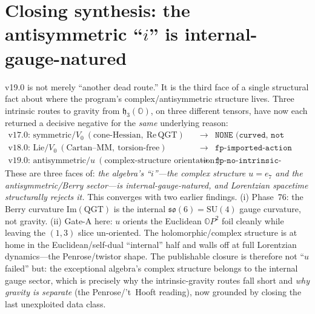 \documentclass[11pt]{article}
\newcommand{\OO}{\mathbb{O}}
\newcommand{\so}{\mathfrak{so}}
\newcommand{\hh}{\mathfrak{h}}
\theoremstyle{plain}\newtheorem{theorem}{Theorem}
\theoremstyle{plain}\newtheorem{proposition}{Proposition}
\theoremstyle{plain}\newtheorem{corollary}{Corollary}
\theoremstyle{definition}\newtheorem{remark}{Remark}
\begin{document}
\section{Closing synthesis: the antisymmetric ``$i$'' is internal-gauge-natured}
v19.0 is not merely ``another dead route.'' It is the third face of a single structural fact
about where the program's complex/antisymmetric structure lives. Three intrinsic routes to
gravity from $\hh_3(\OO)$, on three different tensors, have now each returned a decisive
negative for the \emph{same} underlying reason:
\[
\begin{array}{lll}
\text{v17.0: symmetric}/V_0\ (\text{cone-Hessian},\ \mathrm{Re}\,\text{QGT}) &\longrightarrow& \texttt{NONE (curved, not Einstein)}\\[2pt]
\text{v18.0: Lie}/V_0\ (\text{Cartan--MM},\ \text{torsion-free}) &\longrightarrow& \texttt{fp-imported-action}\\[2pt]
\text{v19.0: antisymmetric}/u\ (\text{complex-structure orientation}) &\longrightarrow& \texttt{fp-no-intrinsic-orientation}
\end{array}
\]
These are three faces of: \emph{the algebra's ``$i$''---the complex structure $u=e_7$ and
the antisymmetric/Berry sector---is internal-gauge-natured, and Lorentzian spacetime
structurally rejects it.} This converges with two earlier findings. (i) Phase~76: the Berry
curvature $\mathrm{Im}(\mathrm{QGT})$ is the internal $\so(6)=\mathrm{SU}(4)$ gauge curvature,
not gravity. (ii) Gate-A here: $u$ orients the Euclidean $\OO P^2$ foil cleanly while leaving
the $(1,3)$ slice un-oriented. The holomorphic/complex structure is at home in the
Euclidean/self-dual ``internal'' half and walls off at full Lorentzian dynamics---the
Penrose/twistor shape. The publishable closure is therefore not ``$u$ failed'' but: the
exceptional algebra's complex structure belongs to the internal gauge sector, which is
precisely why the intrinsic-gravity routes fall short and \emph{why gravity is separate}
(the Penrose/'t~Hooft reading), now grounded by closing the last unexploited data class.

\end{document}
